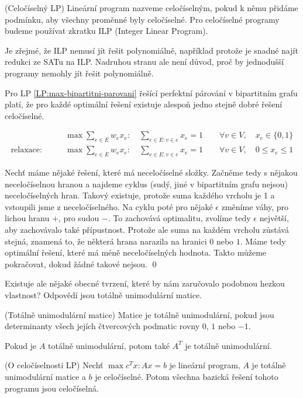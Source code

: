 \label{LP:celociselnost}
\df (Celočíselný LP) Lineární program nazveme celočíselným, pokud k němu přidáme
podmínku, aby všechny proměnné byly celočíselné. Pro celočíselné programy budeme
používat zkratku ILP (Integer Linear Program).

Je zřejmé, že ILP nemusí jít řešit polynomiálně, například protože je snadné
najít redukci ze SATu na ILP. Nadruhou stranu ale není důvod, proč by jednodušší
programy nemohly jít řešit polynomiálně. 

\tv Pro LP \eqref{LP:max-bipartitni-parovani} řešící perfektní párování v bipartitním grafu platí, že pro každé
optimální řešení existuje alespoň jedno stejně dobré řešení celočíselné.

\begin{align}
\label{LP:max-bipartitni-parovani}
&\max \sum_{e \in E} w_e x_e: \quad \sum_{e \in E: v \in e} x_e = 1 \qquad\forall v
	\in V, \quad x_e \in \{0, 1\} \\
	\text{relaxace:}\qquad	&\max \sum_{e \in E} w_e x_e: \quad \sum_{e \in E: v \in e} x_e = 1 \qquad\forall v
	\in V, \quad 0 \leq x_e \leq 1
\end{align}

\dk Nechť máme nějaké řešení, které má neceločíselné
složky. Začněme tedy s nějakou neceločíselnou hranou a najdeme cyklus (sudý,
jiné v bipartitním grafu nejsou) neceločíselných hran. Takový existuje, protože
suma každého vrcholu je 1 a vstoupili jsme z neceločíselného. Na cyklu poté pro
nějaké $\epsilon$ změníme váhy, pro lichou hranu $+$, pro sudou $-$. To
zachovává optimalitu, zvolíme tedy $\epsilon$ největší, aby zachovávalo také
přípustnost. Protože ale suma na každém vrcholu zůstává stejná, znamená to, že
některá hrana narazila na hranici $0$ nebo $1$. Máme tedy optimální řešení,
které má méně neceločíselných hodnota. Takto můžeme pokračovat, dokud žádné
takové nejsou. \qed

Existuje ale nějaké obecné tvrzení, které by nám zaručovalo podobnou hezkou
vlastnost? Odpovědí jsou totálně unimodulární matice.

\df (Totálně unimodulární matice) Matice je totálně unimodulární, pokud jsou
determinanty všech jejích čtvercových podmatic rovny $0$, $1$ nebo $-1$.

\poz Pokud je $A$ totálně unimodulární, potom také $A^T$ je totálně
unimodulární.

\vt (O celočíselnosti LP) Nechť $\max c^Tx : Ax = b$ je lineární program, $A$ je totálně
unimodulární matice a $b$ je celočíselné. Potom všechna bazická řešení tohoto
programu jsou celočíselná.

